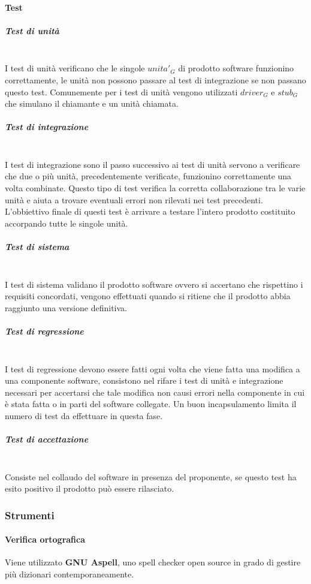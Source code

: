 		\paragraph{Test}
			\subparagraph{Test di unità} \mbox{} \\
			I test di unità verificano che le singole $unita'_G$ di prodotto software funzionino correttamente, le unità non possono passare al test di integrazione se non passano questo test.
			Comunemente per i test di unità vengono utilizzati $driver_G$ e $stub_G$ che simulano il chiamante e un unità chiamata.
			\subparagraph{Test di integrazione} \mbox{} \\
			I test di integrazione sono il passo successivo ai test di unità servono a verificare che due o più unità, precedentemente verificate, funzionino correttamente una volta combinate.
			Questo tipo di test verifica la corretta collaborazione tra le varie unità e aiuta a trovare eventuali errori non rilevati nei test precedenti.
			L'obbiettivo finale di questi test è arrivare a testare l'intero prodotto costituito accorpando tutte le singole unità.
			\subparagraph{Test di sistema} \mbox{} \\
			I test di sistema validano il prodotto software ovvero si accertano che rispettino i requisiti concordati, vengono effettuati quando si ritiene che il prodotto abbia raggiunto una versione definitiva.
			\subparagraph{Test di regressione}	\mbox{} \\
			I test di regressione devono essere fatti ogni volta che viene fatta una modifica a una componente software, consistono nel rifare i test di unità e integrazione necessari per accertarsi che tale modifica non causi errori nella componente in cui è stata fatta o in parti del software collegate.
			Un buon incapsulamento limita il numero di test da effettuare in questa fase.				
			\subparagraph{Test di accettazione} \mbox{} \\
			Consiste nel collaudo del software in presenza del proponente, se questo test ha esito positivo il prodotto può essere rilasciato.
	\subsubsection{Strumenti}
			\paragraph{Verifica ortografica}
			Viene utilizzato \textbf{GNU Aspell}, uno spell checker open source in grado di gestire più dizionari contemporaneamente.

